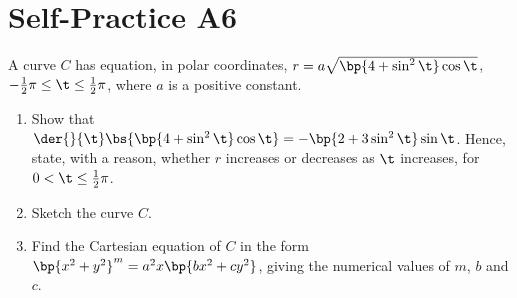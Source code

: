 \section{Self-Practice A6}

\begin{problem}
    A curve $C$ has equation, in polar coordinates, $r = a\sqrt{\bp{4 + \sin^2 \t} \cos \t}$, $-\frac12 \pi \leq \t \leq \frac12 \pi$, where $a$ is a positive constant.

    \begin{enumerate}
        \item Show that $\der{}{\t} \bs{\bp{4 + \sin^2 \t}\cos\t} = -\bp{2 + 3\sin^2 \t} \sin \t$. Hence, state, with a reason, whether $r$ increases or decreases as $\t$ increases, for $0 < \t \leq \frac12 \pi$.
        \item Sketch the curve $C$.
        \item Find the Cartesian equation of $C$ in the form $\bp{x^2 + y^2}^m = a^2 x \bp{bx^2 + cy^2}$, giving the numerical values of $m$, $b$ and $c$.
    \end{enumerate}
\end{problem}

